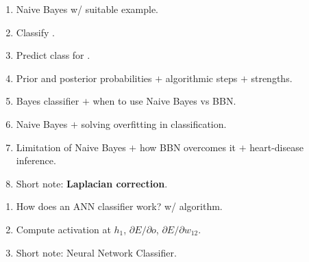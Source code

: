 \begin{enumerate}[start=17]
  \item \tS{} Naive Bayes w/ suitable example. \hfill {}   
  \item {} Classify . \hfill {} 
  \item {} Predict class for . \hfill {} 
  \item {} Prior and posterior probabilities $+$ algorithmic steps $+$ strengths. \hfill {} 
  \item {} Bayes classifier $+$ when to use Naive Bayes vs BBN. \hfill {} 
  \item {} Naive Bayes $+$ solving overfitting in classification. \hfill {} 
  \item {} Limitation of Naive Bayes $+$ how BBN overcomes it $+$ heart-disease inference. \hfill {} 
  \item {} Short note: \textbf{Laplacian correction}. \hfill {} 
\end{enumerate}

\begin{enumerate}[start=25]
  \item {} How does an ANN classifier work? w/ algorithm. \hfill {}   
  \item {} Compute activation at $h_1$, $\partial E/\partial o$, $\partial E/\partial w_{12}$. \hfill {} 
  \item {} Short note: Neural Network Classifier. \hfill {} 
\end{enumerate}

